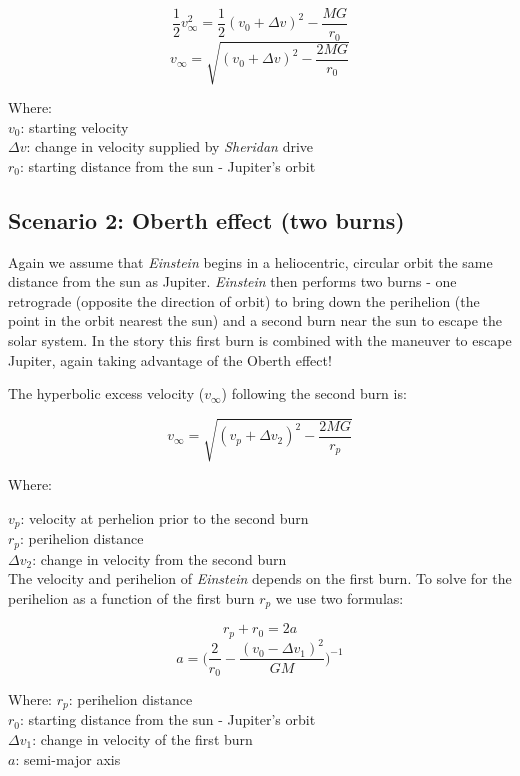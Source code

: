 \documentclass[12pt]{article} %
\begin{document}
$$\frac{1}{2}v_{\infty}^{2} = \frac{1}{2} (v_0 + \Delta v)^2 - \frac{MG}{r_0}$$
$$v_{\infty} = \sqrt{(v_0 + \Delta v)^2-\frac{2MG}{r_0}}$$

Where:\\

$v_0$: starting velocity\\
$\Delta v$: change in velocity supplied by \textit{Sheridan} drive\\
$r_0$: starting distance from the sun - Jupiter's orbit

\subsection{Scenario 2: Oberth effect (two burns)}

Again we assume that \textit{Einstein} begins in a heliocentric, circular orbit the same distance from the sun as Jupiter. \textit{Einstein} then performs two burns - one retrograde (opposite the direction of orbit) to bring down the perihelion (the point in the orbit nearest the sun) and a second burn near the sun to escape the solar system. In the story this first burn is combined with the maneuver to escape Jupiter, again taking advantage of the Oberth effect!

The hyperbolic excess velocity ($ v_{\infty}$) following the second burn is:

$$v_{\infty} = \sqrt{(v_p + \Delta v_2)^2-\frac{2MG}{r_p}}$$

Where:

$v_p$: velocity at perhelion prior to the second burn\\
$r_p$: perihelion distance\\
$\Delta v_2$: change in velocity from the second burn\\

The velocity and perihelion of \textit{Einstein} depends on the first burn. To solve for the perihelion as a function of the first burn $r_p$ we use two formulas:

$$r_p + r_0 = 2a$$
$$a = \bigg(\frac{2}{r_0} - \frac{(v_0-\Delta v_1)^2}{GM}\bigg)^{-1}$$

Where:
$r_p$: perihelion distance\\
$r_0$: starting distance from the sun - Jupiter's orbit\\
$\Delta v_1$: change in velocity of the first burn\\
$a$: semi-major axis\\
\end{document}
